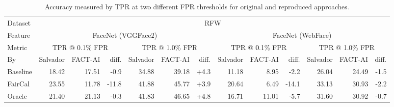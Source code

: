 \begin{table}
\caption{Accuracy measured by TPR at two different FPR thresholds for original and reproduced approaches.}
\begin{tabular}{l|rrr|rrr|rrr|rrr|}
\toprule
Dataset & \multicolumn{12}{c|}{RFW} \\
Feature & \multicolumn{6}{c|}{FaceNet (VGGFace2)} & \multicolumn{6}{c|}{FaceNet (WebFace)} \\
Metric & \multicolumn{3}{c|}{TPR @ 0.1\% FPR} & \multicolumn{3}{c|}{TPR @ 1.0\% FPR} & \multicolumn{3}{c|}{TPR @ 0.1\% FPR} & \multicolumn{3}{c|}{TPR @ 1.0\% FPR} \\
By & Salvador & FACT-AI & diff. & Salvador & FACT-AI & diff. & Salvador & FACT-AI & diff. & Salvador & FACT-AI & diff. \\
\midrule
Baseline & 18.42 & 17.51 &  -0.9 & 34.88 & 39.18 &  +4.3 & 11.18 & 8.95 &  -2.2 & 26.04 & 24.49 &  -1.5 \\
FairCal & 23.55 & 11.78 & -11.8 & 41.88 & 45.77 &  +3.9 & 20.64 & 6.49 & -14.1 & 33.13 & 30.93 &  -2.2 \\
Oracle & 21.40 & 21.13 &  -0.3 & 41.83 & 46.65 &  +4.8 & 16.71 & 11.01 &  -5.7 & 31.60 & 30.92 &  -0.7 \\
\bottomrule
\end{tabular}
\end{table}
